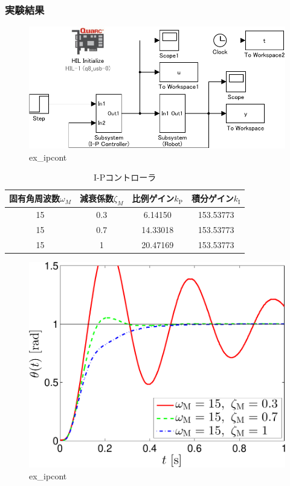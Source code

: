 \subsubsection{実験結果}
\begin{figure}[h]
  \centering
  \includegraphics[scale=1]{sozai/ex_ipcont-crop.pdf}
  \caption{ex\_ipcont}
\end{figure}

\begin{table}[h]
  \centering
  \caption{I-Pコントローラ}
  \begin{tabular}{|c|c|c|c|}
    \hline
    固有角周波数$\omega_M$ & 減衰係数$\zeta_M$ & 比例ゲイン$k_{\mathrm{P}}$ & 積分ゲイン$k_{\mathrm{I}}$ \\
    \hline
    15                     & 0.3               & 6.14150                    & 153.53773                  \\
    15                     & 0.7               & 14.33018                   & 153.53773                  \\
    15                     & 1                 & 20.47169                   & 153.53773                  \\
    \hline
  \end{tabular}
\end{table}

\begin{figure}[h]
  \centering
  \includegraphics[scale=0.5]{sozai/figure_ipcont_angle-crop.pdf}
  \caption{ex\_ipcont}
\end{figure}

